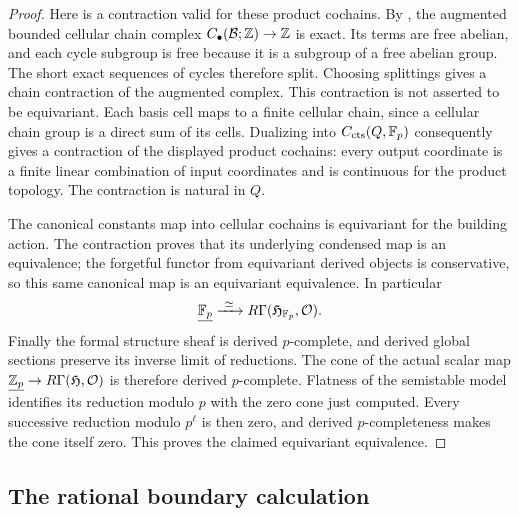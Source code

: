 \begin{proof}
Here is a contraction valid for these product cochains.  By
, the augmented bounded cellular chain complex
$C_\bullet(\mathcal B;\mathbb Z)\to\mathbb Z$ is exact.  Its terms are free abelian,
and each cycle subgroup is free because it is a subgroup of a free
abelian group.  The short exact sequences of cycles therefore split.
Choosing splittings gives a chain contraction of the augmented
complex.  This contraction is not asserted to be equivariant.
Each basis cell maps to a finite cellular chain, since a cellular
chain group is a direct sum of its cells.  Dualizing into
$C_{\mathrm{cts}}(Q,\mathbb F_p)$ consequently gives a contraction of the
displayed product cochains: every output coordinate is a finite
linear combination of input coordinates and is continuous for the
product topology.  The contraction is natural in $Q$.

The canonical constants map into cellular cochains is equivariant
for the building action.  The contraction proves that its underlying
condensed map is an equivalence; the forgetful functor from equivariant
derived objects is conservative, so this same canonical map is an
equivariant equivalence.  In particular
\[
 \underline{\mathbb F_p}\xrightarrow{\ \simeq\ }
 R\Gamma(\mathfrak H_{\mathbb F_p},\mathcal O).
\]
Finally the formal structure sheaf is derived $p$-complete, and
derived global sections preserve its inverse limit of reductions.
The cone of the actual scalar map
$\underline{\mathbb Z_p}\to R\Gamma(\mathfrak H,\mathcal O)$ is therefore
derived $p$-complete.  Flatness of the semistable model identifies
its reduction modulo $p$ with the zero cone just computed.  Every
successive reduction modulo $p^\ell$ is then zero, and derived
$p$-completeness makes the cone itself zero.  This proves the
claimed equivariant equivalence.
\end{proof}

\subsection{The rational boundary calculation}

